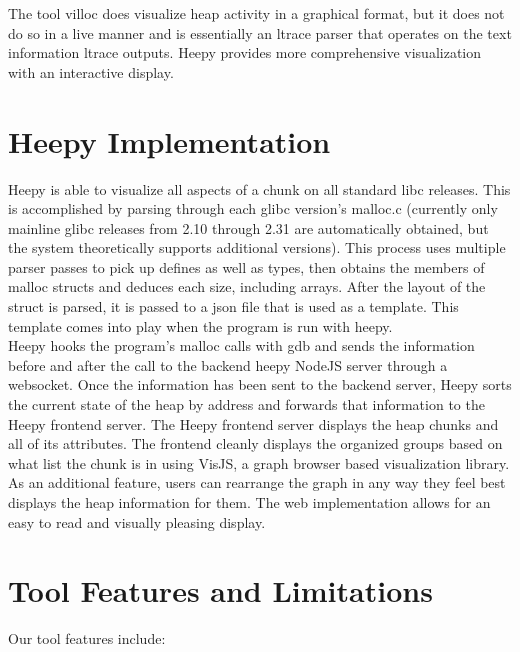 \documentclass[12pt]{article}
\begin{document}
\hspace{\parindent} The tool villoc does visualize heap activity in a graphical format, but it does not do so in a live manner and is essentially an ltrace parser that operates on the text information ltrace outputs. Heepy provides more comprehensive visualization with an interactive display. \\

\section{Heepy Implementation}

\hspace{\parindent} Heepy is able to visualize all aspects of a chunk on all standard libc releases. This is accomplished by parsing through each glibc version’s malloc.c (currently only mainline glibc releases from 2.10 through 2.31 are automatically obtained, but the system theoretically supports additional versions). This process uses multiple parser passes to pick up defines as well as types, then obtains the members of malloc structs and deduces each size, including arrays. After the layout of the struct is parsed, it is passed to a json file that is used as a template. This template comes into play when the program is run with heepy. \\

\hspace{\parindent} Heepy hooks the program’s malloc calls with gdb and sends the information before and after the call to the backend heepy NodeJS server through a websocket. Once the information has been sent to the backend server, Heepy sorts the current state of the heap by address and forwards that information to the Heepy frontend server. The Heepy frontend server displays the heap chunks and all of its attributes. The frontend cleanly displays the organized groups based on what list the chunk is in using VisJS, a graph browser based visualization library. As an additional feature, users can rearrange the graph in any way they feel best displays the heap information for them. The web implementation allows for an easy to read and visually pleasing display. \\

\section{Tool Features and Limitations}

Our tool features include: \\
\end{document}
